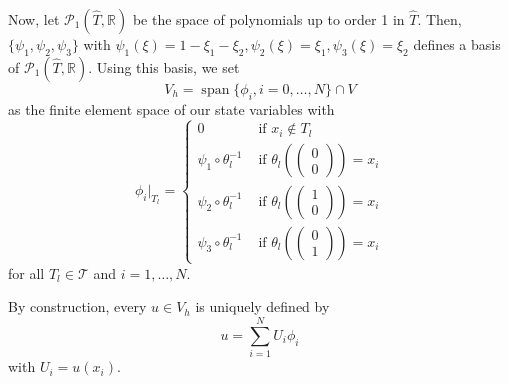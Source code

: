 Now, let $\mathcal{P}_1(\hat{T}, \mathbb{R})$ be the space of polynomials up to order 1 in $\hat{T}$. Then, $\{\psi_1, \psi_2, \psi_3\}$ with $\psi_1(\xi)=1-\xi_1-\xi_2, \psi_2(\xi)=\xi_1, \psi_3(\xi)=\xi_2$ defines a basis of $\mathcal{P}_1(\hat{T}, \mathbb{R})$.
Using this basis, we set
\begin{displaymath}
V_h=\operatorname*{span}\{\phi_i, i=0,\dotsc,N\}\cap V
\end{displaymath}
as the finite element space of our state variables with
\begin{displaymath}
\phi_i|_{T_l}=\begin{cases}
0 & \text{ if $x_i\notin T_l$}\\
\psi_1 \circ \theta_l^{-1} & \text{ if $\theta_l\left(\begin{pmatrix} 0 \\ 0 \end{pmatrix}\right)=x_i$}\\
\psi_2 \circ \theta_l^{-1} & \text{ if $\theta_l\left(\begin{pmatrix} 1 \\ 0 \end{pmatrix}\right)=x_i$}\\
\psi_3 \circ \theta_l^{-1} & \text{ if $\theta_l\left(\begin{pmatrix} 0 \\ 1 \end{pmatrix}\right)=x_i$}
\end{cases} 
\end{displaymath}
for all $T_l\in\mathcal{T}$ and $i=1,\dotsc,N$.

By construction, every $u\in V_h$ is uniquely defined by
\begin{displaymath}
u=\sum_{i=1}^NU_i\phi_i
\end{displaymath}
with $U_i=u(x_i)$.\\

